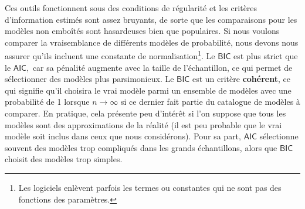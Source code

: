 \documentclass[
  11pt,
  letterpaper,
]{scrbook}
\theoremstyle{plain}
\theoremstyle{plain}
\theoremstyle{definition}
\theoremstyle{definition}
\theoremstyle{remark}
\begin{document}
Ces outils fonctionnent sous des conditions de régularité et les
critères d'information estimés sont assez bruyants, de sorte que les
comparaisons pour les modèles non emboîtés sont hasardeuses bien que
populaires. Si nous voulons comparer la vraisemblance de différents
modèles de probabilité, nous devons nous assurer qu'ils incluent une
constante de normalisation\footnote{Les logiciels enlèvent parfois les
  termes ou constantes qui ne sont pas des fonctions des paramètres.}.
Le \(\mathsf{BIC}\) est plus strict que le \(\mathsf{AIC},\) car sa
pénalité augmente avec la taille de l'échantillon, ce qui permet de
sélectionner des modèles plus parsimonieux. Le \(\mathsf{BIC}\) est un
critère \textbf{cohérent}, ce qui signifie qu'il choisira le vrai modèle
parmi un ensemble de modèles avec une probabilité de 1 lorsque
\(n \to \infty\) si ce dernier fait partie du catalogue de modèles à
comparer. En pratique, cela présente peu d'intérêt si l'on suppose que
tous les modèles sont des approximations de la réalité (il est peu
probable que le vrai modèle soit inclus dans ceux que nous considérons).
Pour sa part, \(\mathsf{AIC}\) sélectionne souvent des modèles trop
compliqués dans les grands échantillons, alors que \(\mathsf{BIC}\)
choisit des modèles trop simples.
\end{document}
